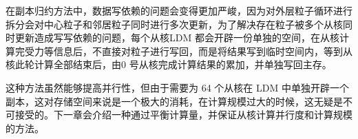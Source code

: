 在副本归约方法中，数据写依赖的问题会变得更加严峻，因为对外层粒子循环进行拆分会对中心粒子和邻居粒子同时进行多次更新，为了解决存在粒子被多个从核同时更新造成写写依赖的问题，每个从核LDM 都会开辟一份单独的空间，在从核计算完受力等信息后，不直接对粒子进行写回，而是将结果写到临时空间内，等到从核此轮计算全部结束后，由0 号从核完成计算结果的累加，并单独写回主存。

这种方法虽然能够提高并行性，但由于需要为 64 个从核在 LDM 中单独开辟一个副本，这对存储空间来说是一个极大的消耗，在计算规模过大的时候，这无疑是不可接受的。下一章会介绍一种通过平衡计算量，并保证从核计算并行度和计算规模的方法。
